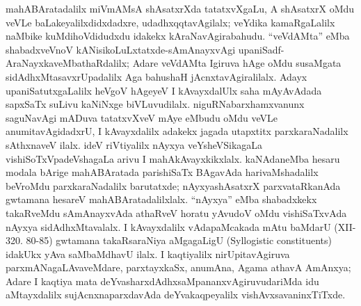 mahABAratadalilx miVmAMsA shAsatxrXda tatatxvXgaLu, A shAsatxrX oMdu veVLe baLake\-yalilxdidxdadxre, udadhxqqtavAgilalx; veYdika kamaRgaLalilx naMbike kuMdihoVdidudxdu idakekx kAraNavAgirabahudu. ``veVdAMta'' eMba shabadxveVnoV kANisikoLuLxtatxde-sAmAnayx\-vAgi upaniSadf-AraNayxkaveMbathaRdalilx; Adare veVdAMta Igiruva hAge oMdu susaMgata sidAdhxMtasavxrUpadalilx Aga bahushaH jAcnxtavAgiralilalx. Adayx upaniSatutxgaLalilx heVgoV hAgeyeV I kAvayxdalUlx saha mAyAvAdada sapxSaTx suLivu kaNiNxge biVLuvudilalx. niguRNabarxhamxvanunx saguNavAgi mADuva tatatxvXveV mAye eMbudu oMdu veVLe anumitavAgidadxrU, I kAvayxdalilx adakekx jagada utapxtitx parxkaraNadalilx sAthxnaveV ilalx. ideV riVtiyalilx nAyxya veYsheVSikagaLa vishiSoTxVpadeVshagaLa arivu I mahAkAvayxkikxlalx. kaNAdaneMba hesaru modala bArige mahABAratada parishiSaTx BAgavAda harivaMshadalilx beVroMdu parxkaraNadalilx barutatxde; nAyxyashAsatxrX parxvataRkanAda gwtamana hesareV mahABAratadalilxlalx. ``nAyxya'' eMba shabadxkekx takaRveMdu sAmAnayxvAda athaRveV horatu yAvudoV oMdu vishiSaTxvAda nAyxya sidAdhxMtavalalx. I kAvayxdalilx vAdapaMcakada mAtu baMdarU {\rm(XII-320. 80-85)} gwtamana takaRsaraNiya aMgagaLigU {\rm(Syllogistic constituents)} idakUkx yAva saMbaMdhavU ilalx. I kaqtiyalilx nirUpitavAgiruva parxmANagaLAvaveMdare, parxtayxkaSx, anumAna, Agama athavA AmAnxya; Adare I kaqtiya mata deYvasharxdAdhxsaMpananxvAgiruvudariMda idu aMtayxdalilx sujAcnxnaparxdavAda deYvakaqpeyalilx vishAvxsavaninxTiTxde.

